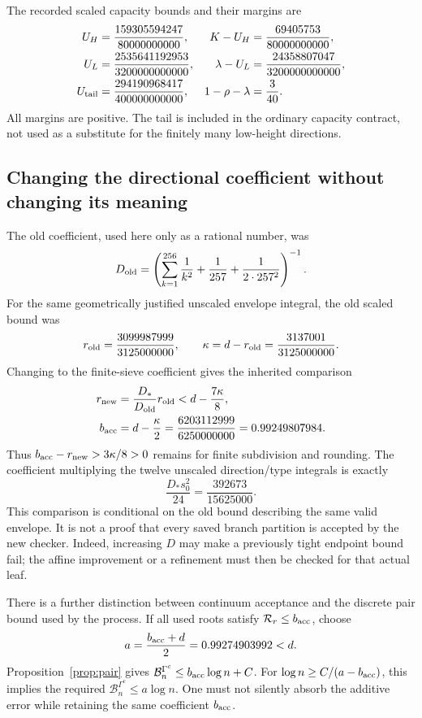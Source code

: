 The recorded scaled capacity bounds and their margins are
\begin{align*}
 U_H&=\frac{159305594247}{80000000000},
 &K-U_H&=\frac{69405753}{80000000000},\\
 U_L&=\frac{2535641192953}{3200000000000},
 &\lambda-U_L&=\frac{24358807047}{3200000000000},\\
 U_{\rm tail}&=\frac{294190968417}{400000000000},
 &1-\rho-\lambda&=\frac3{40}.
\end{align*}
All margins are positive. The tail is included in the ordinary
capacity contract, not used as a substitute for the finitely many
low-height directions.

\subsection{Changing the directional coefficient without changing its meaning}
The old coefficient, used here only as a rational number, was
\[
 D_{\rm old}=\left(\sum_{k=1}^{256}\frac1{k^2}
                    +\frac1{257}+\frac1{2\cdot257^2}\right)^{-1}.
\]
For the same geometrically justified unscaled envelope integral,
the old scaled bound was
\[
 r_{\rm old}=\frac{3099987999}{3125000000},\qquad
 \kappa=d-r_{\rm old}=\frac{3137001}{3125000000}.
\]
Changing to the finite-sieve coefficient gives the inherited comparison
\begin{align}
 r_{\rm new}&=\frac{D_*}{D_{\rm old}}r_{\rm old}
       <d-\frac{7\kappa}{8},\label{eq:risktransfer}\\
 b_{\rm acc}&=d-\frac\kappa2
       =\frac{6203112999}{6250000000}=0.99249807984.
       \label{eq:bacc}
\end{align}
Thus \(b_{\rm acc}-r_{\rm new}>3\kappa/8>0\) remains for finite
subdivision and rounding. The coefficient multiplying the twelve
unscaled direction/type integrals is exactly
\[
 \frac{D_*s_0^2}{24}=\frac{392673}{15625000}.
\]
This comparison is conditional on the old bound describing the same
valid envelope. It is not a proof that every saved branch partition
is accepted by the new checker. Indeed, increasing \(D\) may make
a previously tight endpoint bound fail; the affine improvement or a
refinement must then be checked for that actual leaf.

There is a further distinction between continuum acceptance and the
discrete pair bound used by the process. If all used roots satisfy
\(\mathcal R_r\le b_{\rm acc}\), choose
\begin{equation}\label{eq:adiscrete}
 a=\frac{b_{\rm acc}+d}{2}=0.99274903992<d.
\end{equation}
Proposition~\ref{prop:pair} gives
\(\mathcal B_n^{\Gamma^c}\le b_{\rm acc}\log n+C\).
For \(\log n\ge C/(a-b_{\rm acc})\), this implies the required
\(\mathcal B_n^{\Gamma^c}\le a\log n\).
One must not silently absorb the additive error while retaining the
same coefficient \(b_{\rm acc}\).

